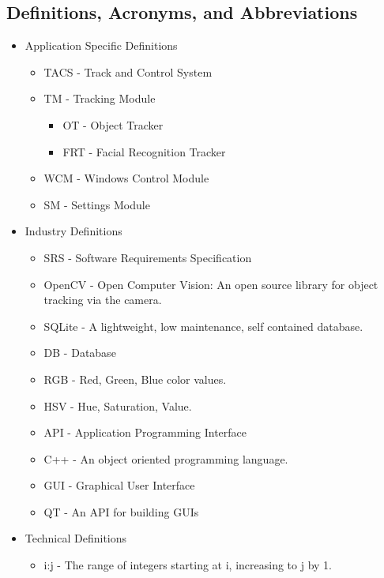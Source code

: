 \documentclass[titlepage]{article}
\begin{document}
\subsection{Definitions, Acronyms, and Abbreviations}
\begin{itemize}
	\item Application Specific Definitions
	\begin{itemize}
		\item TACS - Track and Control System
		\item TM - Tracking Module
		\begin{itemize}
			\item OT - Object Tracker
			\item FRT - Facial Recognition Tracker
		\end{itemize}
		\item WCM - Windows Control Module
		\item SM - Settings Module
	\end{itemize}
	\item Industry Definitions
	\begin{itemize}
		\item SRS - Software Requirements Specification
		\item OpenCV - Open Computer Vision: An open source library for object tracking via the camera.
		\item SQLite - A lightweight, low maintenance, self contained database.
		\item DB - Database
		\item RGB - Red, Green, Blue color values.
		\item HSV - Hue, Saturation, Value.
		\item API - Application Programming Interface
		\item C++ - An object oriented programming language.
		\item GUI - Graphical User Interface
		\item QT - An API for building GUIs
	\end{itemize}
	\item Technical Definitions
	\begin{itemize}
		\item i:j - The range of integers starting at i, increasing to j by 1.
	\end{itemize}
\end{itemize}

\end{document}
